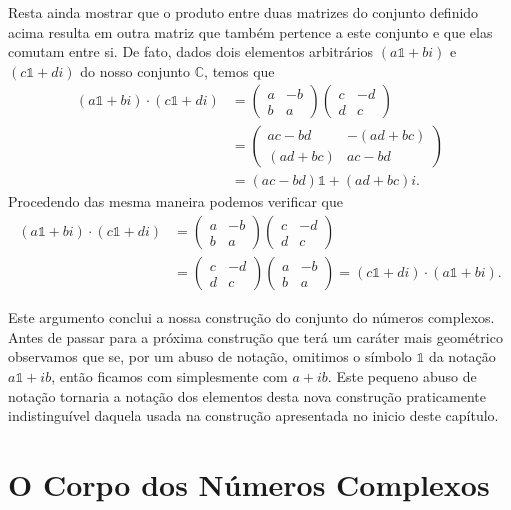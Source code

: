 Resta ainda mostrar que o produto entre duas matrizes do conjunto definido acima 
resulta em outra matriz que também pertence a este conjunto e que 
elas comutam entre si. 
De fato, dados dois elementos arbitrários $(a\mathds{1}+ bi)$ e $(c\mathds{1}+ di)$ 
do nosso conjunto $\mathbb{C}$, temos que
\begin{align*}
(a\mathds{1}+ bi)\cdot(c\mathds{1}+ di)
&=
\begin{pmatrix}
a&-b\\
b&a
\end{pmatrix}
\begin{pmatrix}
c&-d\\
d&c
\end{pmatrix}
\\
&=\begin{pmatrix}
ac-bd& -(ad+bc)\\
(ad+bc)&ac-bd
\end{pmatrix}
\\
&=
(ac-bd)\mathds{1}+ (ad+bc)i.
\end{align*}
Procedendo das mesma maneira podemos verificar que 
\begin{align*}
(a\mathds{1}+ bi)\cdot(c\mathds{1}+ di)
&=
\begin{pmatrix}
a&-b\\
b&a
\end{pmatrix}
\begin{pmatrix}
c&-d\\
d&c
\end{pmatrix}
\\
&=
\begin{pmatrix}
c&-d\\
d&c
\end{pmatrix}
\begin{pmatrix}
a&-b\\
b&a
\end{pmatrix}
=
(c\mathds{1}+ di)\cdot(a\mathds{1}+ bi).
\end{align*}

Este argumento conclui a nossa construção do conjunto do números complexos. 
Antes de passar para a próxima construção que terá um caráter mais geométrico
observamos que se, por um abuso de notação, omitimos o símbolo $\mathds{1}$ 
da notação $a\mathds{1}+ib$, então ficamos com simplesmente com $a+ib$. 
Este pequeno abuso de notação tornaria a notação dos elementos desta nova 
construção praticamente indistinguível 
daquela usada na construção apresentada no inicio deste capítulo. 


\section{O Corpo dos Números Complexos}

